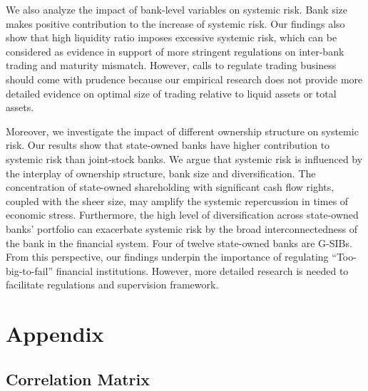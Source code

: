 \documentclass[
  letterpaper,
  DIV=11,
  numbers=noendperiod]{scrreprt}
\begin{document}
We also analyze the impact of bank-level variables on systemic risk.
Bank size makes positive contribution to the increase of systemic risk.
Our findings also show that high liquidity ratio imposes excessive
systemic risk, which can be considered as evidence in support of more
stringent regulations on inter-bank trading and maturity mismatch.
However, calls to regulate trading business should come with prudence
because our empirical research does not provide more detailed evidence
on optimal size of trading relative to liquid assets or total assets.

Moreover, we investigate the impact of different ownership structure on
systemic risk. Our results show that state-owned banks have higher
contribution to systemic risk than joint-stock banks. We argue that
systemic risk is influenced by the interplay of ownership structure,
bank size and diversification. The concentration of state-owned
shareholding with significant cash flow rights, coupled with the sheer
size, may amplify the systemic repercussion in times of economic stress.
Furthermore, the high level of diversification across state-owned banks'
portfolio can exacerbate systemic risk by the broad interconnectedness
of the bank in the financial system. Four of twelve state-owned banks
are G-SIBs. From this perspective, our findings underpin the importance
of regulating ``Too-big-to-fail'' financial institutions. However, more
detailed research is needed to facilitate regulations and supervision
framework.

\section{Appendix}\label{appendix-1}

\subsection{Correlation Matrix}\label{correlation-matrix}
\end{document}
